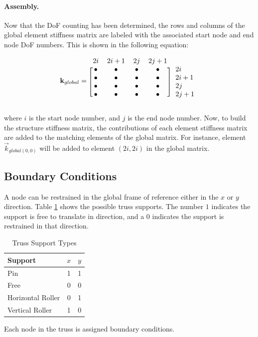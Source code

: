 \paragraph{Assembly.} Now that the DoF counting has been determined, the rows and columns of the global element stiffness matrix are labeled with the associated start node and end node DoF numbers. This is shown in the following equation:

\begin{align}
\vec{k}_{global}=
\begin{blockarray}{ccccc}
2i & 2i+1 & 2j & 2j+1 & \\
\begin{block}{[cccc]l}
  \bullet & \bullet & \bullet & \bullet & 2i\\
  \bullet & \bullet & \bullet & \bullet & 2i+1\\
  \bullet & \bullet & \bullet & \bullet & 2j\\
  \bullet & \bullet & \bullet & \bullet & 2j+1\\
\end{block}
\end{blockarray}
\end{align}

where $i$ is the start node number, and $j$ is the end node number. Now, to build the structure stiffness matrix, the contributions of each element stiffness matrix are added to the matching elements of the global matrix. For instance, element $\vec{k}_{global (0,0)}$ will be added to element $(2i, 2i)$ in the global matrix.



\subsection{Boundary Conditions}
A node can be restrained in the global frame of reference either in the $x$ or $y$ direction. Table \ref{Tab:TrussSupports} shows the possible truss supports. The number $1$ indicates the support is free to translate in direction, and a $0$ indicates the support is restrained in that direction.

\begin{table}[h]
\centering
\caption{Truss Support Types}
\label{Tab:TrussSupports}
\begin{tabular}{|l|c|c|}
\hline
Support & $x$ & $y$\\ \hline
Pin & 1 & 1\\ \hline
Free & 0 & 0\\ \hline
Horizontal Roller & 0& 1 \\ \hline
Vertical Roller & 1 & 0 \\ \hline
\end{tabular}
\end{table}

Each node in the truss is assigned boundary conditions.


